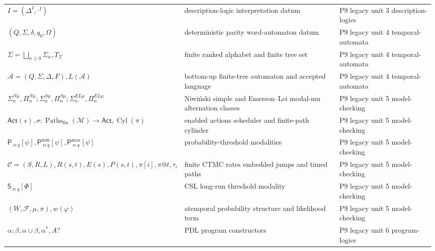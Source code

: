 \begin{longtable}{@{}p{}p{}p{}@{}}
\(I=(\Delta^I,\allowbreak \mathord{\cdot}^I)\) & description-logic interpretation datum & P9 legacy unit 3 description-\allowbreak{}logics \\
\((Q,\allowbreak \Sigma,\allowbreak \delta,\allowbreak q_0,\allowbreak \Omega)\) & deterministic parity word-automaton datum & P9 legacy unit 4 temporal-\allowbreak{}automata \\
\(\Sigma=\bigsqcup_{n\geq0}\Sigma_n,\allowbreak T_\Sigma\) & finite ranked alphabet and finite tree set & P9 legacy unit 4 temporal-\allowbreak{}automata \\
\(\mathcal A=(Q,\allowbreak \Sigma,\allowbreak \Delta,\allowbreak F),\allowbreak L(\mathcal A)\) & bottom-up finite-tree automaton and accepted language & P9 legacy unit 4 temporal-\allowbreak{}automata \\
\(\Sigma_n^{N\mu},\allowbreak \Pi_n^{N\mu};\allowbreak \Sigma_n^{S\mu},\allowbreak \Pi_n^{S\mu};\allowbreak \Sigma_n^{EL\mu},\allowbreak \Pi_n^{EL\mu}\) & Niwiński simple and Emerson--Lei modal-mu alternation classes & P9 legacy unit 5 model-\allowbreak{}checking \\
\(\mathsf{Act}(s),\allowbreak \sigma:\operatorname{Paths}_{\mathrm{fin}}(\mathcal M)\to\mathsf{Act},\allowbreak \operatorname{Cyl}(\pi)\) & enabled actions scheduler and finite-path cylinder & P9 legacy unit 5 model-\allowbreak{}checking \\
\(\mathsf P_{\bowtie q}[\psi],\allowbreak \mathsf P^{\min}_{\bowtie q}[\psi],\allowbreak \mathsf P^{\max}_{\bowtie q}[\psi]\) & probability-threshold modalities & P9 legacy unit 5 model-\allowbreak{}checking \\
\(\mathcal C=(S,\allowbreak R,\allowbreak L),\allowbreak R(s,\allowbreak t),\allowbreak E(s),\allowbreak P(s,\allowbreak t),\allowbreak \pi[i],\allowbreak \pi@t,\allowbreak \tau_i\) & finite CTMC rates embedded jumps and timed paths & P9 legacy unit 5 model-\allowbreak{}checking \\
\(\mathsf S_{\bowtie q}[\Phi]\) & CSL long-run threshold modality & P9 legacy unit 5 model-\allowbreak{}checking \\
\((W,\allowbreak \mathcal F,\allowbreak \mu,\allowbreak \pi),\allowbreak w(\varphi)\) & atemporal probability structure and likelihood term & P9 legacy unit 5 model-\allowbreak{}checking \\
\(\alpha;\allowbreak \beta,\allowbreak \alpha\cup\beta,\allowbreak \alpha^*,\allowbreak A?\) & PDL program constructors & P9 legacy unit 6 program-\allowbreak{}logics \\

\end{longtable}
